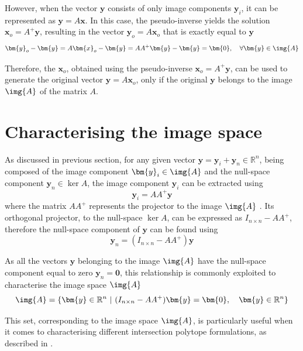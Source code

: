However, when the vector $\bm{y}$ consists of only image components $\bm{y}_i$, it can be represented as $\bm{y} = A\bm{x}$. In this case, the pseudo-inverse yields the solution $\bm{x}_o = A^+\bm{y}$, resulting in the vector $\bm{y}_o = A\bm{x}_o$ that is exactly equal to $\bm{y}$
\begin{equation}
\bm{y}_o-\bm{y} = A\bm{x}_o -\bm{y} = AA^+\bm{y} - \bm{y} =\bm{0}, \quad \forall\bm{y}\in\img{A}
\end{equation}

Therefore, the $\bm{x}_o$, obtained using the pseudo-inverse $\bm{x}_o=A^+\bm{y}$, can be used to generate the original vector $\bm{y} = A\bm{x}_o$, only if the original $\bm{y}$ belongs to the image $\img{A}$ of the matrix $A$. 


\section{Characterising the image space}
\label{ch:image_char}

As discussed in previous section, for any given vector $\bm{y} = \bm{y}_i + \bm{y}_n\in\mathbb{R}^n$, being composed of the image component $\bm{y}_i\in\img{A}$ and the null-space component $\bm{y}_n\in\ker{A}$, the image component $\bm{y}_i$ can be extracted using 
\begin{equation}
    \bm{y}_i =  AA^+\bm{y}
\end{equation}
where the matrix $AA^+$ represents the projector to the image $\img{A}$ \cite[p. 430]{meyer2001Matrix}. Its orthogonal projector, to the null-space $\ker{A}$, can be expressed as $I_{n\times n} - AA^+$, therefore the null-space component of $\bm{y}$ can be found using
\begin{equation}
    \bm{y}_n = (I_{n\times n} - AA^+)\bm{y}
\end{equation}

As all the vectors $\bm{y}$ belonging to the image $\img{A}$ have the null-space component equal to zero $\bm{y}_n=\bm{0}$, this relationship is commonly exploited to characterise the image space $\img{A}$
\begin{equation}
   \img{A} = \{ \bm{y}\in\mathbb{R}^n ~|~(I_{n\times n} - AA^+)\bm{y} = \bm{0}, \quad \bm{y}\in\mathbb{R}^n \}
   \label{eq:image_poly}
\end{equation}

This set, corresponding to the image space $\img{A}$, is particularly useful when it comes to characterising different intersection polytope formulations, as described in .